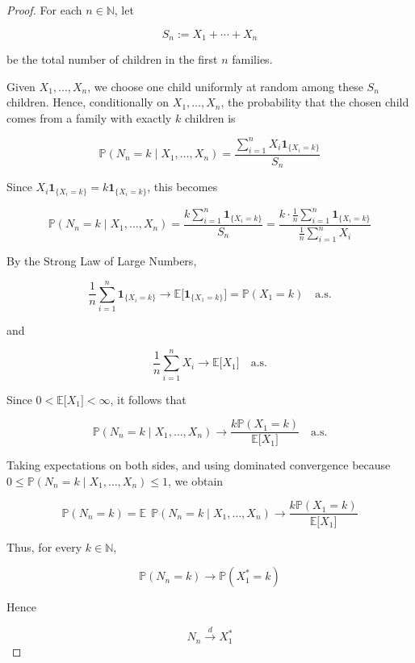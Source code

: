 \documentclass{qlnotes-export}
\begin{document}
\begin{proof}

For each \(n \in {\mathbb{N}}\), let

\[S_{n} := X_{1} + \cdots + X_{n}\]

be the total number of children in the first \(n\) families.

Given \(X_{1},\ldots,X_{n}\), we choose one child uniformly at random among these \(S_{n}\) children. Hence, conditionally on \(X_{1},\ldots,X_{n}\), the probability that the chosen child comes from a family with exactly \(k\) children is

\[{\mathbb{P}}(N_{n} = k \mid X_{1},\ldots,X_{n}) = \frac{\sum_{i = 1}^{n}X_{i}\mathbf{1}_{\{{X_{i} = k}\}}}{S_{n}}\]

Since \(X_{i}\mathbf{1}_{\{{X_{i} = k}\}} = k\mathbf{1}_{\{{X_{i} = k}\}}\), this becomes

\[{\mathbb{P}}(N_{n} = k \mid X_{1},\ldots,X_{n}) = \frac{k\sum_{i = 1}^{n}\mathbf{1}_{\{{X_{i} = k}\}}}{S_{n}} = \frac{k \cdot \frac{1}{n}\sum_{i = 1}^{n}\mathbf{1}_{\{{X_{i} = k}\}}}{\frac{1}{n}\sum_{i = 1}^{n}X_{i}}\]

By the Strong Law of Large Numbers,

\[\frac{1}{n}\sum\limits_{i = 1}^{n}\mathbf{1}_{\{{X_{i} = k}\}}\rightarrow{\mathbb{E}}\lbrack\mathbf{1}_{\{{X_{1} = k}\}}\rbrack = {\mathbb{P}}(X_{1} = k)\quad\text{a.s.}\]

and

\[\frac{1}{n}\sum\limits_{i = 1}^{n}X_{i}\rightarrow{\mathbb{E}}\lbrack X_{1}\rbrack\quad\text{a.s.}\]

Since \(0 < {\mathbb{E}}\lbrack X_{1}\rbrack < \infty\), it follows that

\[{\mathbb{P}}(N_{n} = k \mid X_{1},\ldots,X_{n})\rightarrow\frac{k{\mathbb{P}}(X_{1} = k)}{{\mathbb{E}}\lbrack X_{1}\rbrack}\quad\text{a.s.}\]

Taking expectations on both sides, and using dominated convergence because \(0 \leq {\mathbb{P}}(N_{n} = k \mid X_{1},\ldots,X_{n}) \leq 1\), we obtain

\[{\mathbb{P}}(N_{n} = k) = {\mathbb{E}}\ \ {\mathbb{P}}(N_{n} = k \mid X_{1},\ldots,X_{n})\rightarrow\frac{k{\mathbb{P}}(X_{1} = k)}{{\mathbb{E}}\lbrack X_{1}\rbrack}\]

Thus, for every \(k \in {\mathbb{N}}\),

\[{\mathbb{P}}(N_{n} = k)\rightarrow{\mathbb{P}}(X_{1}^{\ast} = k)\]

Hence

\[N_{n}\overset{d}{\rightarrow}X_{1}^{\ast}\]

\end{proof}
\end{document}

